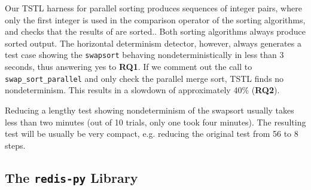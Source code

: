 {

Our TSTL harness for parallel sorting produces sequences of
integer pairs, where only the first integer is used in the comparison
operator of the sorting algorithms, and checks that the results of
are sorted..
Both sorting algorithms always produce sorted output.  The
horizontal determinism detector, however, always generates a 
test case showing the {\tt swapsort} behaving nondeterministically in
less than 3 seconds, thus
answering yes to {\bf  RQ1}.  If we comment out the call to {\tt
  swap\_sort\_parallel} and only check the parallel merge sort, TSTL
finds no nondeterminism.  This results in a slowdown of approximately
40\% ({\bf RQ2}).

Reducing a lengthy test showing nondeterminism of the swapsort usually takes less than two
minutes (out of 10 trials, only one took four minutes).  The resulting test will be usually be very compact, e.g.
reducing the original test from 56 to 8 steps.

\subsection {The {\tt redis-py} Library}


}
